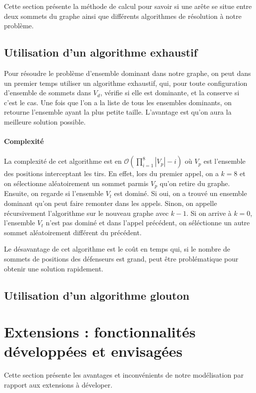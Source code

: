 \documentclass[12pt]{article}
\begin{document}
Cette section présente la méthode de calcul pour savoir si une arête se situe entre deux sommets du graphe ainsi que différents algorithmes de résolution à notre problème.


\subsection{Utilisation d'un algorithme exhaustif}
Pour résoudre le problème d'ensemble dominant dans notre graphe, on peut dans un premier temps utiliser un algorithme exhaustif, qui, pour toute configuration d'ensemble de sommets dans $V_d$, vérifie si elle est dominante, et la conserve si c'est le cas. Une fois que l'on a la liste de tous les ensembles dominants, on retourne l'ensemble ayant la plus petite taille. L'avantage est qu'on aura la meilleure solution possible.

\paragraph{Complexité} La complexité de cet algorithme est en $\mathcal{O}(\prod_{i = 1}^{8}|V_p|-i)$ où $V_p$ est l'ensemble des positions interceptant les tirs. En effet, lors du premier appel, on a $k=8$ et on sélectionne aléatoirement un sommet parmis $V_p$ qu'on retire du graphe. Ensuite, on regarde si l'ensemble $V_t$ est dominé. Si oui, on a trouvé un ensemble dominant qu'on peut faire remonter dans les appels. Sinon, on appelle récursivement l'algorithme sur le nouveau graphe avec $k - 1$. Si on arrive à $k = 0$, l'ensemble $V_t$ n'est pas dominé et dans l'appel précédent, on séléctionne un autre sommet aléatoirement différent du précédent.

Le désavantage de cet algorithme est le coût en temps qui, si le nombre de sommets de positions des défenseurs est grand, peut être problématique pour obtenir une solution rapidement.

\subsection{Utilisation d'un algorithme glouton}

\section{Extensions : fonctionnalités développées et envisagées}

Cette section présente les avantages et inconvénients de notre modélisation par rapport aux extensions à déveloper.
\end{document}
